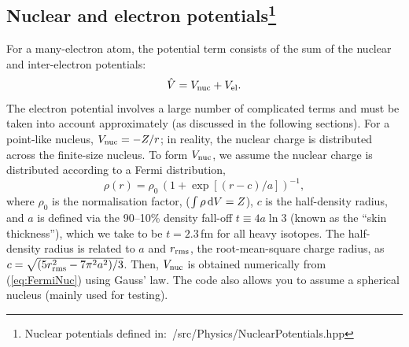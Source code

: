 \documentclass[10pt,twocolumn,a4paper]{article}%
\renewcommand{\v}[1]{\ensuremath{\boldsymbol{#1}}}		%
\newcommand{\be}{\begin{equation}}
\newcommand{\ee}{\end{equation}}
\def\d{\ensuremath{{\rm d}}}
\def\en{\ensuremath{\varepsilon}}
\renewcommand{\k}{\ensuremath{\kappa}}
\begin{document}

%


\subsection[Nuclear and electron potentials]{Nuclear and electron potentials\footnote{Nuclear potentials defined in:~/src/Physics/NuclearPotentials.hpp}}



For a many-electron atom, the potential term consists of the sum of the nuclear and inter-electron potentials:
\be
\hat V = V_{\rm nuc} + V_{\rm el}.
\ee
The electron potential
involves a large number of complicated terms and must be taken into account approximately
 (as discussed in the following sections).
For a point-like nucleus, $V_{\rm nuc} = -Z/r$;
in reality, the nuclear charge is distributed across the finite-size nucleus. %
%
To form $V_{\rm nuc}$, we assume the nuclear charge is distributed according to a Fermi distribution,
\begin{equation}\label{eq:FermiNuc}
\rho(r) = {\rho_0}\,{\left(1+\exp[(r-c)/a]\right)^{-1}},
\end{equation}
where $\rho_0$ is the normalisation factor,  ($\int\rho\,\d V = Z$), 
$c$ is the half-density radius, and 
$a$ is defined via the 90--10\% density fall-off {${t\equiv 4a\ln3}$} (known as the ``skin thickness''),
which we take to be $t=2.3$\,{\rm fm} for all heavy isotopes.
The half-density radius is related to $a$ and $r_{\rm rms}$, the root-mean-square charge radius, as $c = \sqrt{(5 r_{\rm rms}^2 -7\pi^2a^2)/3}$.
Then, $V_{\rm nuc}$ is obtained numerically from (\ref{eq:FermiNuc}) using Gauss' law.
The code also allows you to assume a spherical nucleus (mainly used for testing).

\end{document}
